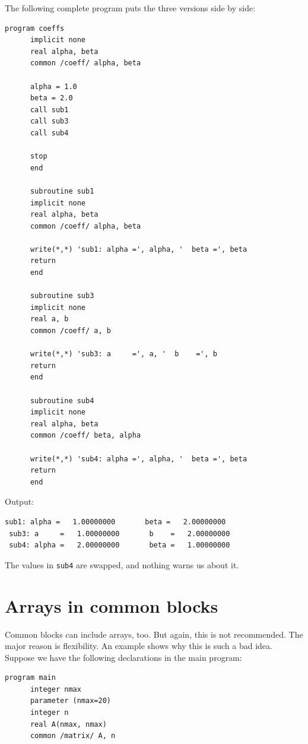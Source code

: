 The following complete program puts the three versions side by side:

\begin{lstlisting}[style=fortran77]
      program coeffs
      implicit none
      real alpha, beta
      common /coeff/ alpha, beta

      alpha = 1.0
      beta = 2.0
      call sub1
      call sub3
      call sub4

      stop
      end

      subroutine sub1
      implicit none
      real alpha, beta
      common /coeff/ alpha, beta

      write(*,*) 'sub1: alpha =', alpha, '  beta =', beta
      return
      end

      subroutine sub3
      implicit none
      real a, b
      common /coeff/ a, b

      write(*,*) 'sub3: a     =', a, '  b    =', b
      return
      end

      subroutine sub4
      implicit none
      real alpha, beta
      common /coeff/ beta, alpha

      write(*,*) 'sub4: alpha =', alpha, '  beta =', beta
      return
      end
\end{lstlisting}

Output:

\begin{lstlisting}[style=output]
 sub1: alpha =   1.00000000       beta =   2.00000000
 sub3: a     =   1.00000000       b    =   2.00000000
 sub4: alpha =   2.00000000       beta =   1.00000000
\end{lstlisting}

The values in \texttt{sub4} are swapped, and nothing warns us about it.

\section{Arrays in common blocks}

Common blocks can include arrays, too. But again, this is not recommended. The major reason is flexibility. An example shows why this is such a bad idea. Suppose we have the following declarations in the main program:

\begin{lstlisting}[style=fortran77]
      program main
      integer nmax
      parameter (nmax=20)
      integer n
      real A(nmax, nmax)
      common /matrix/ A, n
\end{lstlisting}


